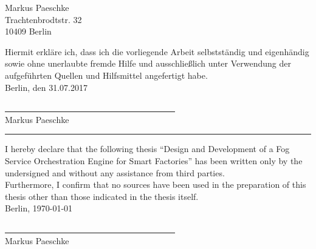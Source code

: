 Markus Paeschke\\
Trachtenbrodtstr. 32\\
10409 Berlin
\vspace{8cm}

Hiermit erkläre ich, dass ich die vorliegende Arbeit selbstständig und eigenhändig sowie ohne unerlaubte fremde Hilfe und ausschließlich unter Verwendung der aufgeführten Quellen und Hilfsmittel angefertigt habe.\\

Berlin, den 31.07.2017\\
\medskip
\medskip

\medskip
\underline{~~~~~~~~~~~~~~~~~~~~~~~~~~~~~~~~~~~~~~~~}\\
Markus Paeschke\\

\rule{\textwidth}{0.4pt}

I hereby declare that the following thesis ``Design and Development of a Fog Service Orchestration Engine for Smart Factories'' has been written only by the undersigned and without any assistance from third parties.\\

Furthermore, I confirm that no sources have been used in the preparation of this thesis other than those indicated in the thesis itself.\\

Berlin, \today\\
\medskip
\medskip

\medskip
\underline{~~~~~~~~~~~~~~~~~~~~~~~~~~~~~~~~~~~~~~~~}\\
Markus Paeschke\\
